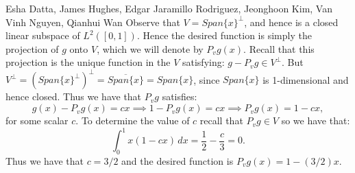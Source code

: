 

\begin{solution}{Esha Datta, James Hughes, Edgar Jaramillo Rodriguez, Jeonghoon Kim, Van Vinh Nguyen, Qianhui Wan}
        Observe that $V = Span\{x\}^\perp$, and hence is a closed linear subspace of $L^2([0,1])$.
        Hence the desired function is simply the projection of $g$ onto $V$, which we will denote by $P_vg(x)$.
        Recall that this projection is the unique function in the $V$ satisfying: $g- P_v g \in V^\perp$.
        But $V^\perp =  (Span\{x\}^\perp)^\perp = \overline{Span\{x\}} = Span\{x\}$, since $Span\{x\}$ is 1-dimensional and hence closed.
        Thus we have that $P_v g$ satisfies:
        \[ g(x) - P_vg(x) = cx \implies 1 -P_vg(x) = cx \implies P_vg(x) = 1-cx, \]
        for some scalar $c$. To determine the value of $c$ recall that $P_vg \in V$ so we have that: 
        \[ \int_0^1 x(1-cx)\,dx = \frac{1}{2}-\frac{c}{3} = 0. \]
        Thus we have that $c=3/2$ and the desired function is $P_vg(x) = 1-(3/2)x$.
\end{solution}

